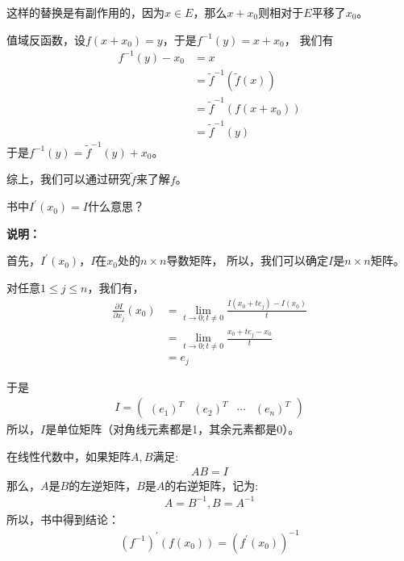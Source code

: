 \documentclass{article}
\begin{document}
\begin{itemize}
        这样的替换是有副作用的，因为$x \in E$，那么$x + x_0$则相对于$E$平移了$x_0$。

        值域反函数，设$f(x + x_0) = y$，于是$f^{-1}(y) = x + x_0$，
        我们有
        \begin{align*}
          f^{-1}(y) - x_0 & = x                            \\
                          & = \tilde{f}^{-1}(\tilde{f}(x)) \\
                          & = \tilde{f}^{-1}(f(x + x_0))   \\
                          & = \tilde{f}^{-1}(y)
        \end{align*}
        于是$f^{-1}(y) = \tilde{f}^{-1}(y) + x_0$。

        综上，我们可以通过研究$\tilde{f}$来了解$f$。
\end{itemize}

\begin{zremark}
  书中$I^\prime(x_0) = I$什么意思？
\end{zremark}

\textbf{说明：}

首先，$I^\prime(x_0)$，$I$在$x_0$处的$n \times n$导数矩阵，
所以，我们可以确定$I$是$n \times n$矩阵。

对任意$1 \leq j \leq n$，我们有，
\begin{align*}
  \frac{\partial I}{\partial x_j}(x_0)
   & = \lim\limits_{t \to 0; t \neq 0} \frac{I(x_0 + t e_j) - I(x_0)}{t} \\
   & = \lim\limits_{t \to 0; t \neq 0} \frac{x_0 + t e_j - x_0}{t}       \\
   & = e_j
\end{align*}

于是
\begin{align*}
  I = \begin{pmatrix}
        (e_1)^T & (e_2)^T & \cdots & (e_n)^T
      \end{pmatrix}
\end{align*}
所以，$I$是单位矩阵（对角线元素都是1，其余元素都是0）。

在线性代数中，如果矩阵$A, B$满足:
\begin{align*}
  A B = I
\end{align*}
那么，$A$是$B$的左逆矩阵，$B$是$A$的右逆矩阵，记为:
\begin{align*}
  A = B^{-1}, B = A^{-1}
\end{align*}
所以，书中得到结论：
\begin{align*}
  (f^{-1})^\prime(f(x_0)) = (f^\prime(x_0))^{-1}
\end{align*}
\end{document}
